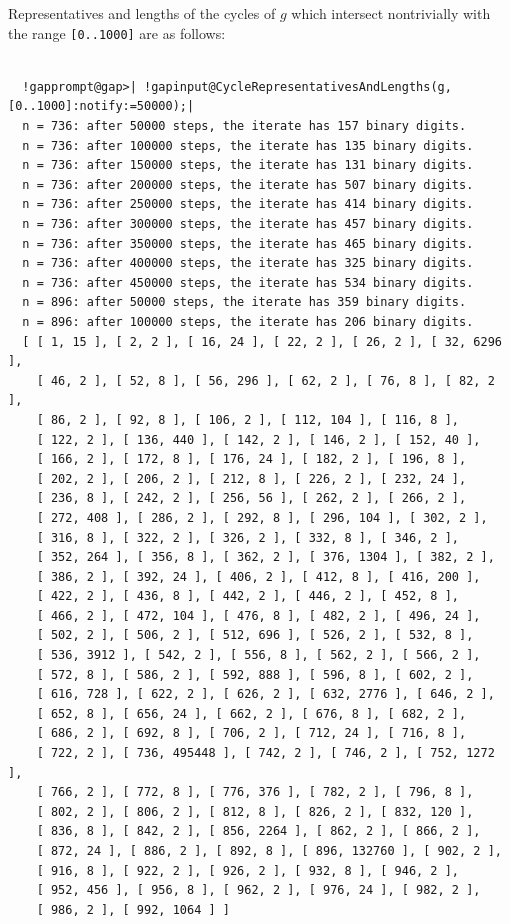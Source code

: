 \documentclass[a4paper,11pt]{report}
\begin{document}
{{\begin{Verbatim}[commandchars=!@A,fontsize=\small,frame=single,label=Example]
\end{Verbatim}
 Representatives and lengths of the cycles of $g$ which intersect nontrivially with the range \texttt{[0..1000]} are as follows: 
\begin{Verbatim}[commandchars=!@|,fontsize=\small,frame=single,label=Example]
  
  !gapprompt@gap>| !gapinput@CycleRepresentativesAndLengths(g,[0..1000]:notify:=50000);|
  n = 736: after 50000 steps, the iterate has 157 binary digits.
  n = 736: after 100000 steps, the iterate has 135 binary digits.
  n = 736: after 150000 steps, the iterate has 131 binary digits.
  n = 736: after 200000 steps, the iterate has 507 binary digits.
  n = 736: after 250000 steps, the iterate has 414 binary digits.
  n = 736: after 300000 steps, the iterate has 457 binary digits.
  n = 736: after 350000 steps, the iterate has 465 binary digits.
  n = 736: after 400000 steps, the iterate has 325 binary digits.
  n = 736: after 450000 steps, the iterate has 534 binary digits.
  n = 896: after 50000 steps, the iterate has 359 binary digits.
  n = 896: after 100000 steps, the iterate has 206 binary digits.
  [ [ 1, 15 ], [ 2, 2 ], [ 16, 24 ], [ 22, 2 ], [ 26, 2 ], [ 32, 6296 ], 
    [ 46, 2 ], [ 52, 8 ], [ 56, 296 ], [ 62, 2 ], [ 76, 8 ], [ 82, 2 ], 
    [ 86, 2 ], [ 92, 8 ], [ 106, 2 ], [ 112, 104 ], [ 116, 8 ], 
    [ 122, 2 ], [ 136, 440 ], [ 142, 2 ], [ 146, 2 ], [ 152, 40 ], 
    [ 166, 2 ], [ 172, 8 ], [ 176, 24 ], [ 182, 2 ], [ 196, 8 ], 
    [ 202, 2 ], [ 206, 2 ], [ 212, 8 ], [ 226, 2 ], [ 232, 24 ], 
    [ 236, 8 ], [ 242, 2 ], [ 256, 56 ], [ 262, 2 ], [ 266, 2 ], 
    [ 272, 408 ], [ 286, 2 ], [ 292, 8 ], [ 296, 104 ], [ 302, 2 ], 
    [ 316, 8 ], [ 322, 2 ], [ 326, 2 ], [ 332, 8 ], [ 346, 2 ], 
    [ 352, 264 ], [ 356, 8 ], [ 362, 2 ], [ 376, 1304 ], [ 382, 2 ], 
    [ 386, 2 ], [ 392, 24 ], [ 406, 2 ], [ 412, 8 ], [ 416, 200 ], 
    [ 422, 2 ], [ 436, 8 ], [ 442, 2 ], [ 446, 2 ], [ 452, 8 ], 
    [ 466, 2 ], [ 472, 104 ], [ 476, 8 ], [ 482, 2 ], [ 496, 24 ], 
    [ 502, 2 ], [ 506, 2 ], [ 512, 696 ], [ 526, 2 ], [ 532, 8 ], 
    [ 536, 3912 ], [ 542, 2 ], [ 556, 8 ], [ 562, 2 ], [ 566, 2 ], 
    [ 572, 8 ], [ 586, 2 ], [ 592, 888 ], [ 596, 8 ], [ 602, 2 ], 
    [ 616, 728 ], [ 622, 2 ], [ 626, 2 ], [ 632, 2776 ], [ 646, 2 ], 
    [ 652, 8 ], [ 656, 24 ], [ 662, 2 ], [ 676, 8 ], [ 682, 2 ], 
    [ 686, 2 ], [ 692, 8 ], [ 706, 2 ], [ 712, 24 ], [ 716, 8 ], 
    [ 722, 2 ], [ 736, 495448 ], [ 742, 2 ], [ 746, 2 ], [ 752, 1272 ], 
    [ 766, 2 ], [ 772, 8 ], [ 776, 376 ], [ 782, 2 ], [ 796, 8 ], 
    [ 802, 2 ], [ 806, 2 ], [ 812, 8 ], [ 826, 2 ], [ 832, 120 ], 
    [ 836, 8 ], [ 842, 2 ], [ 856, 2264 ], [ 862, 2 ], [ 866, 2 ], 
    [ 872, 24 ], [ 886, 2 ], [ 892, 8 ], [ 896, 132760 ], [ 902, 2 ], 
    [ 916, 8 ], [ 922, 2 ], [ 926, 2 ], [ 932, 8 ], [ 946, 2 ], 
    [ 952, 456 ], [ 956, 8 ], [ 962, 2 ], [ 976, 24 ], [ 982, 2 ], 
    [ 986, 2 ], [ 992, 1064 ] ]
  

\end{Verbatim}}}
\end{document}
